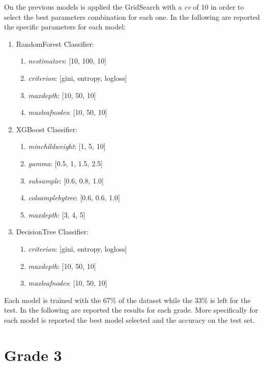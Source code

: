 \documentclass[12pt,a4paper,openright,twoside]{book}
\begin{document}
On the previous models is applied the GridSearch with a \emph{cv} of 10 in order to select the best parameters combination for each one. In the following are reported the specific parameters for each model:
\begin{enumerate}
    \item RandomForest Classifier:
    \begin{enumerate}
        \item \emph{n\textunderscore estimators}: [10, 100, 10]
        \item \emph{criterion}: [gini, entropy, log\textunderscore loss]
        \item \emph{max\textunderscore depth}: [10, 50, 10]
        \item \emph{max\textunderscore leaf\textunderscore nodes}: [10, 50, 10]
    \end{enumerate}
    \item XGBoost Classifier:
    \begin{enumerate}
        \item \emph{min\textunderscore child\textunderscore weight}: [1, 5, 10]
        \item \emph{gamma}: [0.5, 1, 1.5, 2.5]
        \item \emph{subsample}: [0.6, 0.8, 1.0]
        \item \emph{colsample\textunderscore bytree}: [0.6, 0.6, 1.0]
        \item \emph{max\textunderscore depth}: [3, 4, 5]
    \end{enumerate}
    \item DecisionTree Classifier:
    \begin{enumerate}
        \item \emph{criterion}: [gini, entropy, log\textunderscore loss]
        \item \emph{max\textunderscore depth}: [10, 50, 10]
        \item \emph{max\textunderscore leaf\textunderscore nodes}: [10, 50, 10]
    \end{enumerate}
\end{enumerate}

Each model is trained with the 67\% of the dataset while the 33\% is left for the test.
In the following are reported the results for each grade. More specifically for each model is reported the best model selected and the accuracy on the test set.
\newpage
\section{Grade 3}
\end{document}

